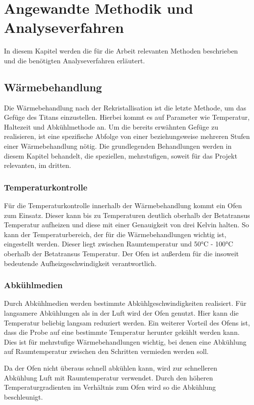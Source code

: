 \documentclass[a4paper, 11pt]{tubsreprt}
\begin{document}
\chapter{Angewandte Methodik und Analyseverfahren}

In diesem Kapitel werden die für die Arbeit relevanten Methoden beschrieben und die benötigten Analyseverfahren erläutert.
\section{Wärmebehandlung}

Die Wärmebehandlung nach der Rekristallisation ist die letzte Methode, um das Gefüge des Titans einzustellen. Hierbei kommt es auf Parameter wie Temperatur, Haltezeit und Abkühlmethode an. Um die bereits erwähnten Gefüge zu realisieren, ist eine spezifische Abfolge von einer beziehungsweise mehreren Stufen einer Wärmebehandlung nötig. Die grundlegenden Behandlungen werden in diesem Kapitel behandelt, die speziellen, mehrstufigen, soweit für das Projekt relevanten, im dritten.
\subsection{Temperaturkontrolle}
Für die Temperaturkontrolle innerhalb der Wärmebehandlung kommt ein Ofen zum Einsatz. Dieser kann bis zu Temperaturen deutlich oberhalb der Betatransus Temperatur aufheizen und diese mit einer Genauigkeit von drei Kelvin halten. So kann der Temperaturbereich, der für die Wärmebehandlungen wichtig ist, eingestellt werden. Dieser liegt zwischen Raumtemperatur und 50°C - 100°C oberhalb der Betatransus Temperatur. Der Ofen ist außerdem für die insoweit bedeutende Aufheizgeschwindigkeit verantwortlich.

\subsection{Abkühlmedien}

Durch Abkühlmedien werden bestimmte Abkühlgeschwindigkeiten realisiert. Für langsamere Abkühlungen als in der Luft wird der Ofen genutzt. Hier kann die Temperatur beliebig langsam reduziert werden. Ein weiterer Vorteil des Ofens ist, dass die Probe auf eine bestimmte Temperatur herunter gekühlt werden kann. Dies ist für mehrstufige Wärmebehandlungen wichtig, bei denen eine Abkühlung auf Raumtemperatur zwischen den Schritten vermieden werden soll. 

Da der Ofen nicht überaus schnell abkühlen kann, wird zur schnelleren Abkühlung Luft mit Raumtemperatur verwendet. Durch den höheren Temperaturgradienten im Verhältnis zum Ofen wird so die Abkühlung beschleunigt.  
\end{document}
